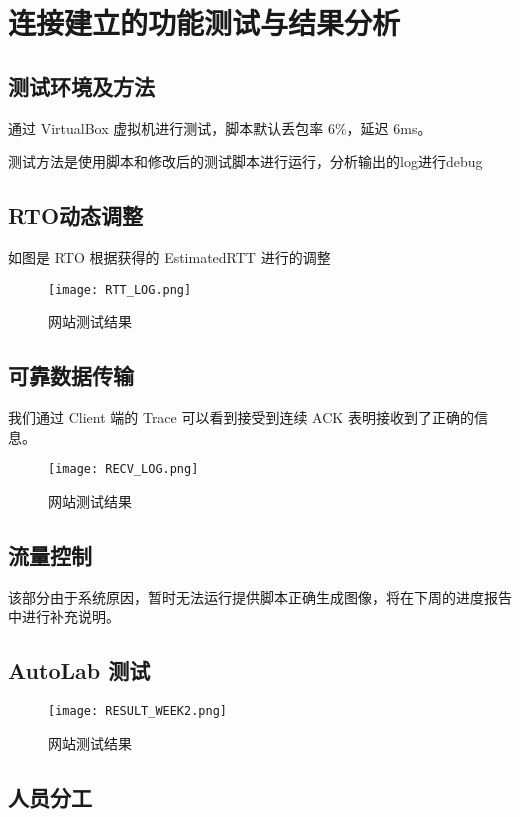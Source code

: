 
\chapter{连接建立的功能测试与结果分析}

\section{测试环境及方法}
通过 VirtualBox 虚拟机进行测试，脚本默认丢包率 6\%，延迟 6ms。

测试方法是使用脚本和修改后的测试脚本进行运行，分析输出的log进行debug

\section{RTO动态调整}
如图是 RTO 根据获得的 EstimatedRTT 进行的调整
\begin{figure}[!htbp]
    \centering
    \texttt{[image: RTT\_LOG.png]}
    \caption{网站测试结果}\label{fig:LOG}
\end{figure}

\section{可靠数据传输}

我们通过 Client 端的 Trace 可以看到接受到连续 ACK 表明接收到了正确的信息。
\begin{figure}[!htbp]
    \centering
    \texttt{[image: RECV\_LOG.png]}
    \caption{网站测试结果}\label{fig:recvLog}
\end{figure}

\section{流量控制}
该部分由于系统原因，暂时无法运行提供脚本正确生成图像，将在下周的进度报告中进行补充说明。


\section{AutoLab 测试}
\begin{figure}[!htbp]
    \centering
    \texttt{[image: RESULT\_WEEK2.png]}
    \caption{网站测试结果}\label{fig:net_test}
\end{figure}


\section{人员分工}

